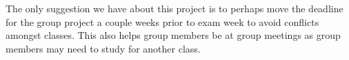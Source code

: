 The only suggestion we have about this project is to perhaps move the deadline for the group project a couple weeks prior to exam week to avoid conflicts amongst classes.  This also helps group members be at group meetings as group members may need to study for another class.
